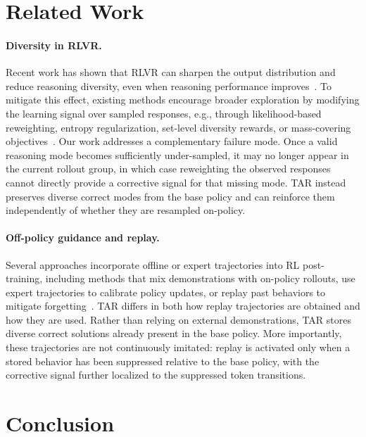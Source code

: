\documentclass[11pt]{article}
\newcommand{\model}{\textsc{TAR}\xspace}
\begin{document}
\section{Related Work}

\paragraph{Diversity in RLVR.}
Recent work has shown that RLVR can sharpen the output distribution and reduce reasoning diversity, even when reasoning performance improves~\cite{yue2025does,wu2025progress,he2025rewarding}.
To mitigate this effect, existing methods encourage broader exploration by modifying the learning signal over sampled responses, e.g., through likelihood-based reweighting, entropy regularization, set-level diversity rewards, or mass-covering objectives~\cite{he2025rewarding,yao2025diversity,chen2026posttraining,li2026divergence}.
Our work addresses a complementary failure mode. Once a valid reasoning mode becomes sufficiently under-sampled, it may no longer appear in the current rollout group, in which case reweighting the observed responses cannot directly provide a corrective signal for that missing mode. \model instead preserves diverse correct modes from the base policy and can reinforce them independently of whether they are resampled on-policy.

\paragraph{Off-policy guidance and replay.}
Several approaches incorporate offline or expert trajectories into RL post-training, including methods that mix demonstrations with on-policy rollouts, use expert trajectories to calibrate policy updates, or replay past behaviors to mitigate forgetting~\cite{luffy,huang2026controllable,yuan2025more}.
\model differs in both how replay trajectories are obtained and how they are used.
Rather than relying on external demonstrations, \model stores diverse correct solutions already present in the base policy.
More importantly, these trajectories are not continuously imitated: replay is activated only when a stored behavior has been suppressed relative to the base policy, with the corrective signal further localized to the suppressed token transitions.



\section{Conclusion}
\end{document}
